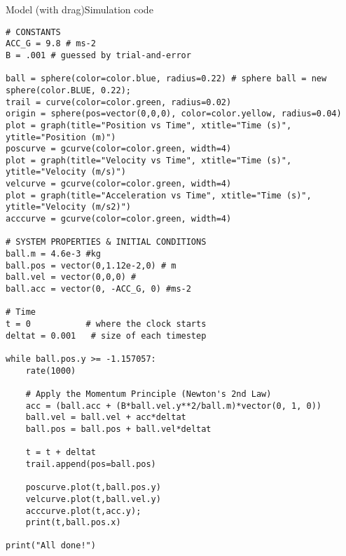 \begin{frame}[fragile]{Model (with drag)}{Simulation code}
\begin{multicols}{2}
\begin{verbatim}
# CONSTANTS
ACC_G = 9.8 # ms-2
B = .001 # guessed by trial-and-error

ball = sphere(color=color.blue, radius=0.22) # sphere ball = new sphere(color.BLUE, 0.22);
trail = curve(color=color.green, radius=0.02)
origin = sphere(pos=vector(0,0,0), color=color.yellow, radius=0.04)
plot = graph(title="Position vs Time", xtitle="Time (s)", ytitle="Position (m)")
poscurve = gcurve(color=color.green, width=4)
plot = graph(title="Velocity vs Time", xtitle="Time (s)", ytitle="Velocity (m/s)")
velcurve = gcurve(color=color.green, width=4)
plot = graph(title="Acceleration vs Time", xtitle="Time (s)", ytitle="Velocity (m/s2)")
acccurve = gcurve(color=color.green, width=4)

# SYSTEM PROPERTIES & INITIAL CONDITIONS
ball.m = 4.6e-3 #kg
ball.pos = vector(0,1.12e-2,0) # m
ball.vel = vector(0,0,0) # 
ball.acc = vector(0, -ACC_G, 0) #ms-2

# Time
t = 0           # where the clock starts
deltat = 0.001   # size of each timestep

while ball.pos.y >= -1.157057:
    rate(1000)

    # Apply the Momentum Principle (Newton's 2nd Law)
    acc = (ball.acc + (B*ball.vel.y**2/ball.m)*vector(0, 1, 0))
    ball.vel = ball.vel + acc*deltat
    ball.pos = ball.pos + ball.vel*deltat
    
    t = t + deltat
    trail.append(pos=ball.pos)

    poscurve.plot(t,ball.pos.y)
    velcurve.plot(t,ball.vel.y)
    acccurve.plot(t,acc.y);
    print(t,ball.pos.x)

print("All done!")
\end{verbatim}
\end{multicols}
\end{frame}